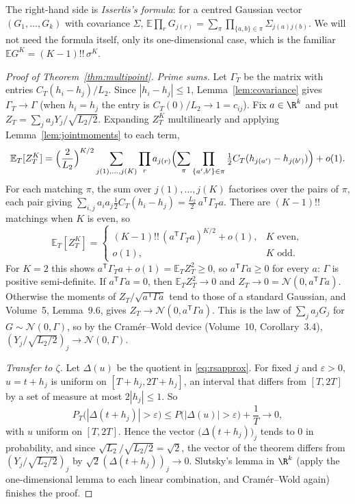 The right-hand side is \emph{Isserlis's formula}: for a centred Gaussian vector $(G_1,\dots,G_k)$ with covariance $\Sigma$, $\mathbb E\prod_rG_{j(r)}=\sum_\pi\prod_{\{a,b\}\in\pi}\Sigma_{j(a)j(b)}$. We will not need the formula itself, only its one-dimensional case, which is the familiar $\mathbb EG^K=(K-1)!!\,\sigma^K$.

\begin{proof}[Proof of Theorem~\ref{thm:multipoint}]
\emph{Prime sums.} Let $\Gamma_T$ be the matrix with entries $C_T(h_i-h_j)/L_2$. Since $|h_i-h_j|\le1$, Lemma~\ref{lem:covariance} gives $\Gamma_T\to\Gamma$ (when $h_i=h_j$ the entry is $C_T(0)/L_2\to1=c_{ij}$). Fix $a\in\R^k$ and put $Z_T=\sum_ja_jY_j/\sqrt{L_2/2}$. Expanding $Z_T^K$ multilinearly and applying Lemma~\ref{lem:jointmoments} to each term,
\[
\mathbb E_T[Z_T^K]=\Bigl(\frac2{L_2}\Bigr)^{K/2}\sum_{j(1),\dots,j(K)}\prod_ra_{j(r)}\Bigl(\sum_\pi\prod_{\{a',b'\}\in\pi}\tfrac12C_T(h_{j(a')}-h_{j(b')})\Bigr)+o(1).
\]
For each matching $\pi$, the sum over $j(1),\dots,j(K)$ factorises over the pairs of $\pi$, each pair giving $\sum_{i,j}a_ia_j\frac12C_T(h_i-h_j)=\frac{L_2}2\,a^{\mathsf T}\Gamma_Ta$. There are $(K-1)!!$ matchings when $K$ is even, so
\[
\mathbb E_T[Z_T^K]=\begin{cases}(K-1)!!\,(a^{\mathsf T}\Gamma_Ta)^{K/2}+o(1),&K\text{ even},\\o(1),&K\text{ odd}.\end{cases}
\]
For $K=2$ this shows $a^{\mathsf T}\Gamma_Ta+o(1)=\mathbb E_TZ_T^2\ge0$, so $a^{\mathsf T}\Gamma a\ge0$ for every $a$: $\Gamma$ is positive semi-definite. If $a^{\mathsf T}\Gamma a=0$, then $\mathbb E_TZ_T^2\to0$ and $Z_T\to0=\mathcal N(0,a^{\mathsf T}\Gamma a)$. Otherwise the moments of $Z_T/\sqrt{a^{\mathsf T}\Gamma a}$ tend to those of a standard Gaussian, and Volume~5, Lemma~9.6, gives $Z_T\to\mathcal N(0,a^{\mathsf T}\Gamma a)$. This is the law of $\sum_ja_jG_j$ for $G\sim\mathcal N(0,\Gamma)$, so by the Cram\'er--Wold device (Volume~10, Corollary~3.4), $(Y_j/\sqrt{L_2/2})_j\to\mathcal N(0,\Gamma)$.

\emph{Transfer to $\zeta$.} Let $\Delta(u)$ be the quotient in \eqref{eq:rsapprox}. For fixed $j$ and $\varepsilon>0$, $u=t+h_j$ is uniform on $[T+h_j,2T+h_j]$, an interval that differs from $[T,2T]$ by a set of measure at most $2|h_j|\le1$. So
\[
P_T\bigl(|\Delta(t+h_j)|>\varepsilon\bigr)\le P\bigl(|\Delta(u)|>\varepsilon\bigr)+\frac1T\longrightarrow0,
\]
with $u$ uniform on $[T,2T]$. Hence the vector $\bigl(\Delta(t+h_j)\bigr)_j$ tends to $0$ in probability, and since $\sqrt{L_2}/\sqrt{L_2/2}=\sqrt2$, the vector of the theorem differs from $(Y_j/\sqrt{L_2/2})_j$ by $\sqrt2(\Delta(t+h_j))_j\to0$. Slutsky's lemma in $\R^k$ (apply the one-dimensional lemma to each linear combination, and Cram\'er--Wold again) finishes the proof.
\end{proof}

